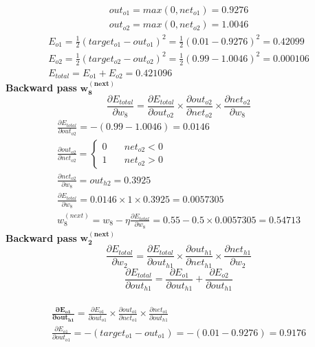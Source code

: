 \documentclass[12pt]{article}
\begin{document}
\begin{enumerate}
\begin{gather*}
out_{o1} = max(0, net_{o1}) = 0.9276\\
out_{o2} = max(0, net_{o2}) = 1.0046
\end{gather*}
\begin{gather*}
E_{o1} = \frac{1}{2}(target_{o1} - out_{o1})^2 = \frac{1}{2}(0.01 - 0.9276)^2 = 0.42099\\
E_{o2} = \frac{1}{2}(target_{o2} - out_{o2})^2 = \frac{1}{2}(0.99 - 1.0046)^2 = 0.000106\\
E_{total} = E_{o1} + E_{o2} = 0.421096
\end{gather*}
\textbf{Backward pass}
$\mathbf{w_8^{(next)}}$
\[\frac{\partial{E_{total}}}{\partial{w_{8}}} = \frac{\partial{E_{total}}}{\partial{out_{o2}}} \times \frac{\partial{out_{o2}}}{\partial{net_{o2}}} \times \frac{\partial{net_{o2}}}{\partial{w_{8}}}\]
\begin{gather*}
\frac{\partial{E_{total}}}{\partial{out_{o2}}} = -(0.99 - 1.0046) = 0.0146\\
\frac{\partial{out_{o2}}}{\partial{net_{o2}}} = 
\begin{cases}
0 & \quad net_{o2} < 0\\
1 & \quad net_{o2} > 0
\end{cases}\\
\frac{\partial{net_{o2}}}{\partial{w_8}} = out_{h2} = 0.3925\\
\frac{\partial{E_{total}}}{\partial{w_{8}}} = 0.0146 \times 1 \times 0.3925 = 0.0057305\\
w_8^{(next)} = w_8 - \eta \frac{\partial{E_{total}}}{\partial{w_{8}}} = 0.55 - 0.5 \times 0.0057305 = 0.54713
\end{gather*}
\textbf{Backward pass}
$\mathbf{w_2^{(next)}}$
\[\frac{\partial{E_{total}}}{\partial{w_{2}}} = \frac{\partial{E_{total}}}{\partial{out_{h1}}} \times \frac{\partial{out_{h1}}}{\partial{net_{h1}}} \times \frac{\partial{net_{h1}}}{\partial{w_{2}}}\]
\[\frac{\partial{E_{total}}}{\partial{out_{h1}}} =\frac{\partial{E_{o1}}}{\partial{out_{h1}}} + \frac{\partial{E_{o2}}}{\partial{out_{h1}}}\]\\
\begin{gather*}
\mathbf{\frac{\partial{E_{o1}}}{\partial{out_{h1}}}} = \frac{\partial{E_{o1}}}{\partial{out_{o1}}} \times \frac{\partial{out_{o1}}}{\partial{net_{o1}}} \times \frac{\partial{net_{o1}}}{\partial{out_{h1}}}\\
\frac{\partial{E_{o1}}}{\partial{out_{o1}}} = -(target_{o1} - out_{o1}) = -(0.01 - 0.9276) = 0.9176\\

\end{gather*}
\end{enumerate}
\end{document}
